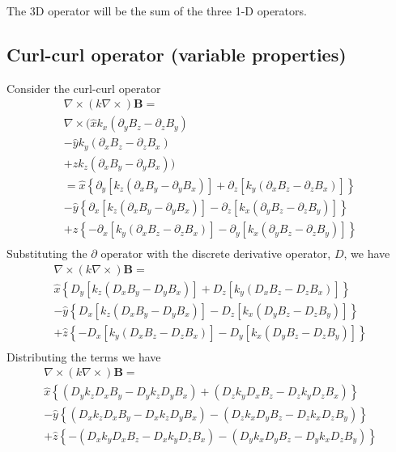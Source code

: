 \documentclass[11pt]{article}
\begin{document}
The 3D operator will be the sum of the three 1-D operators.

\subsection{Curl-curl operator (variable properties)}

Consider the curl-curl operator
\begin{multline}
  \nabla \times (k \nabla \times) \mathbf{B} = \\
  \nabla \times (
  \hat{x} k_x (\partial_y B_z - \partial_z B_y) \\
  - \hat{y} k_y (\partial_x B_z - \partial_z B_x) \\
  + \hat{z} k_z (\partial_x B_y - \partial_y B_x) ) \\  = 
   \hat{x} \left\{ \partial_y \left[ k_z (\partial_x B_y - \partial_y B_x) \right] +
    \partial_z \left[ k_y (\partial_x B_z - \partial_z B_x) \right] \right\} \\
  -\hat{y} \left\{ \partial_x \left[ k_z (\partial_x B_y - \partial_y B_x) \right] -
   \partial_z \left[ k_x (\partial_y B_z - \partial_z B_y) \right]  \right\} \\
  +\hat{z} \left\{ -\partial_x \left[ k_y (\partial_x B_z - \partial_z B_x) \right] -
   \partial_y \left[ k_x (\partial_y B_z - \partial_z B_y) \right]  \right\} \\
\end{multline}
Substituting the $\partial$ operator with the discrete derivative operator, $D$, we have
\begin{multline}
  \nabla \times (k \nabla \times) \mathbf{B} = \\
   \hat{x} \left\{ D_y \left[ k_z (D_x B_y - D_y B_x) \right] +
    D_z \left[ k_y (D_x B_z - D_z B_x) \right] \right\} \\
  -\hat{y} \left\{ D_x \left[ k_z (D_x B_y - D_y B_x) \right] -
   D_z \left[ k_x (D_y B_z - D_z B_y) \right]  \right\} \\
  +\hat{z} \left\{ -D_x \left[ k_y (D_x B_z - D_z B_x) \right] -
   D_y \left[ k_x (D_y B_z - D_z B_y) \right]  \right\} \\
\end{multline}
Distributing the terms we have
\begin{multline}
  \nabla \times (k \nabla \times) \mathbf{B} = \\
   \hat{x} \left\{   (D_y k_z D_x B_y - D_y k_z D_y B_x)   +  (D_z k_y D_x B_z - D_z k_y D_z B_x) \right\} \\
  -\hat{y} \left\{   (D_x k_z D_x B_y - D_x k_z D_y B_x)   -  (D_z k_x D_y B_z - D_z k_x D_z B_y) \right\} \\
  +\hat{z} \left\{ - (D_x k_y D_x B_z - D_x k_y D_z B_x)   -  (D_y k_x D_y B_z - D_y k_x D_z B_y) \right\} \\
\end{multline}
\end{document}
